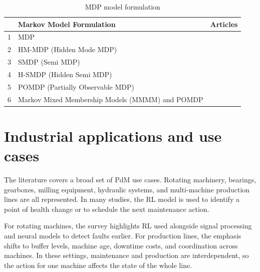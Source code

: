\documentclass[12pt,oneside]{book}
\renewcommand{\arraystretch}{1.5}
\begin{document}
\begin{table}[h]
\renewcommand\arraystretch{1.5}
\begin{center}
	\begin{minipage}{\textwidth}
		\caption{MDP model formulation}\label{tbl:XMarkovFormulation}
		\begin{tabular}{@{} R{0.5cm} L{6.5cm} L{6.5cm}@{}}
			\toprule
			&\textbf{Markov Model Formulation}&\textbf{Articles}\\
			&MDP&\cite{R-SMART-Gosavi2004, Gosavi2016235, Mikhail2019133, Shi2019, Andriotis2019, Barde2019147, Chen2022484, Paraschos2020470, Yang2021, Yang201880}\\
			2&HM-MDP (Hidden Mode MDP)&\cite{Hofmann2020464, Yang20131647}\\
			3&SMDP (Semi MDP)&\cite{Ling2018364, Adsule2020182, R-SMART-Gosavi2004, SMART-Das1999, iSMART-Encapera2017, Wang20149, Hosseinloo2021, Wang2021PredictiveMaintenance, Wang2016325, Wang2015614}\\
			4&H-SMDP (Hidden Semi MDP)&\cite{Wang20149}\\
			5&POMDP (Partially Observable MDP)&\cite{Hofmann2020464, Andriotis2019, Andriotis2021}\\
			6&Markov Mixed Membership Models (MMMM) and POMDP & \cite{Hofmann2020464}\\
			\bottomrule
		\end{tabular}
	\end{minipage}
\end{center}
\end{table}
	
\section{Industrial applications and use cases}
The literature covers a broad set of PdM use cases. Rotating machinery, bearings, gearboxes, milling equipment, hydraulic systems, and multi-machine production lines are all represented. In many studies, the RL model is used to identify a point of health change or to schedule the next maintenance action.

For rotating machines, the survey highlights RL used alongside signal processing and neural models to detect faults earlier. For production lines, the emphasis shifts to buffer levels, machine age, downtime costs, and coordination across machines. In these settings, maintenance and production are interdependent, so the action for one machine affects the state of the whole line.
\end{document}
